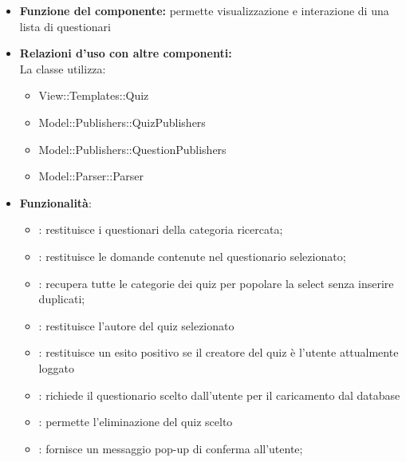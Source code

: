 \begin{itemize}
\item\textbf{Funzione del componente:} permette visualizzazione e interazione di una lista di questionari
				\item\textbf{Relazioni d'uso con altre componenti:}\\
La classe utilizza:
	\begin{itemize}
		\item View::Templates::Quiz
		\item Model::Publishers::QuizPublishers
		\item Model::Publishers::QuestionPublishers
		\item Model::Parser::Parser
	\end{itemize}
\item\textbf{Funzionalità}:
	\begin{itemize}
		\item{}: restituisce i questionari della categoria ricercata;\\
		\item{}: restituisce le domande contenute nel questionario selezionato;\\
		\item{}: recupera tutte le categorie dei quiz per popolare la select senza inserire duplicati;\\
		\item{}: restituisce l'autore del quiz selezionato\\
		\item{}: restituisce un esito positivo se il creatore del quiz è l'utente attualmente loggato\\
		\item{}: richiede il questionario scelto dall'utente per il caricamento dal database\\
		\item{}: permette l'eliminazione del quiz scelto\\
		\item{}: fornisce un messaggio pop-up di conferma all'utente;\\
	\end{itemize}
\end{itemize}
\newpage

